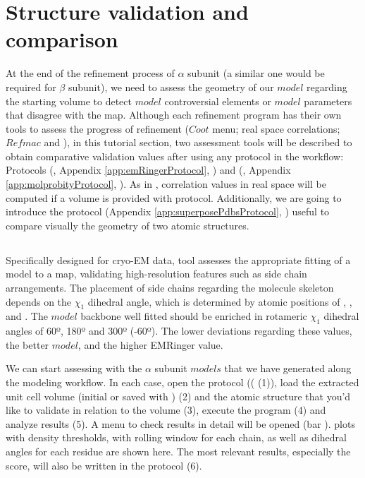 \section{Structure validation and comparison}

 At the end of the refinement process of  $\alpha$ subunit (a similar one would be required for $\beta$ subunit), we need to assess the geometry of our $model$ regarding the starting 
volume to detect $model$ controversial elements or $model$ parameters that disagree with the map. Although each refinement program has their own tools to assess the progress of refinement ($Coot$  menu; \phenix {} real space correlations; $Refmac$  and ), in this tutorial section, two assessment tools will be described to obtain comparative validation values after using any protocol in the workflow:  Protocols \emringer (, Appendix \ref{app:emRingerProtocol}, \citep{barad2015}) and \molprobity (, Appendix \ref{app:molprobityProtocol}, \citep{davis2004}). As in \phenix, correlation values in real space will be computed if a volume is provided with \molprobity protocol. Additionally, we are going to introduce the protocol  (Appendix \ref{app:superposePdbsProtocol}, \citep{zwartUrl}) useful to compare visually the geometry of two atomic structures.\\


 \subsection*{\emringer}
 
 Specifically designed for cryo-EM data, \emringer tool assesses the appropriate fitting of a model to a map, validating high-resolution features such as side chain arrangements. The placement of side chains regarding the molecule skeleton depends on the $\chi_{1}$ dihedral angle, which is determined by atomic positions of , ,  and . The $model$ backbone well fitted should be enriched in rotameric $\chi_{1}$ dihedral angles of 60º, 180º and 300º (-60º). The lower deviations regarding these values, the better $model$, and the higher EMRinger value.  
 
 We can start assessing with \emringer the  $\alpha$ subunit $models$ that we have generated along the modeling workflow. In each case, open the  protocol (( (1)), load the extracted unit cell volume (initial or saved with \coot) (2) and the atomic structure that you'd like to validate in relation to the volume (3), execute the program (4) and analyze results (5). A menu to check results in detail will be opened (bar ).  plots with density thresholds, with rolling window for each chain, as well as dihedral angles for each residue are shown here. The most relevant results, especially the \emringer score, will also be written in the protocol  (6). 
 
